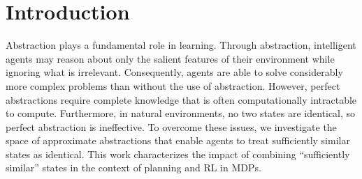 \section{Introduction}
Abstraction plays a fundamental role in learning. Through abstraction, intelligent agents may reason about only the salient features of their environment while ignoring what is irrelevant. Consequently, agents are able to solve considerably more complex problems than without the use of abstraction. However, perfect abstractions require complete knowledge that is often computationally intractable to compute. Furthermore, in natural environments, no two states are identical, so perfect abstraction is ineffective. To overcome these issues, we investigate the space of approximate abstractions that enable agents to treat sufficiently similar states as identical. This work characterizes the impact of combining ``sufficiently similar'' states in the context of planning and \ac{RL} in \acp{MDP}.















